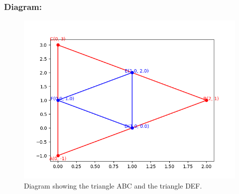 \documentclass{beamer}
\begin{document}
\begin{frame}
    \frametitle{Diagram:}
    \begin{figure}
        \centering
        \includegraphics[width=0.9\linewidth]{triangle_diagram.png}
        \caption{Diagram showing the triangle ABC and the triangle DEF.}
        \label{fig:triangle_diagram}
    \end{figure}
\end{frame}
\end{document}
